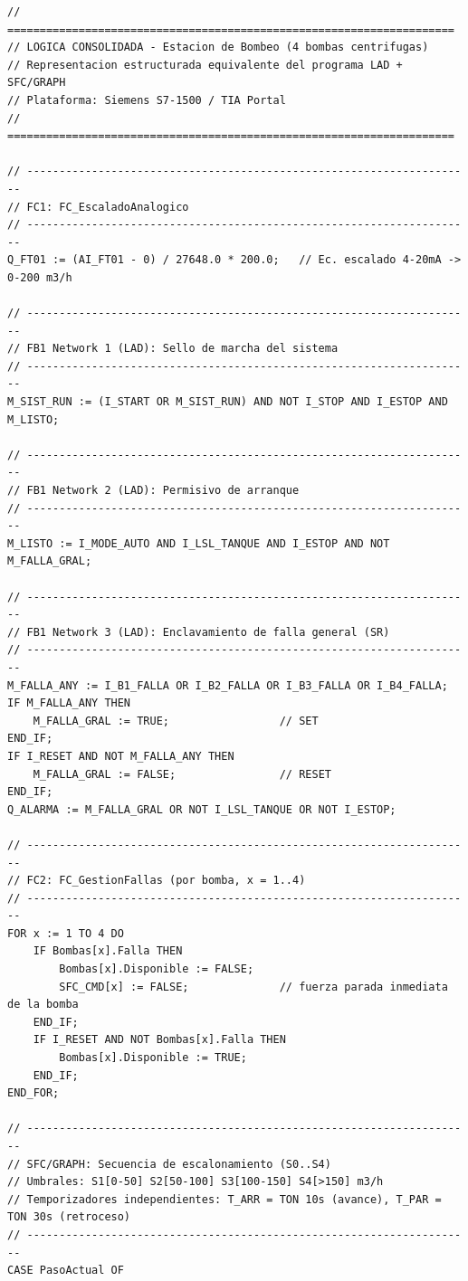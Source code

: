 \documentclass[conference]{IEEEtran}
\begin{document}
\begin{lstlisting}[caption={Equivalente estructurado consolidado de la lógica LAD + SFC}, label={lst:consolidado}]
// =====================================================================
// LOGICA CONSOLIDADA - Estacion de Bombeo (4 bombas centrifugas)
// Representacion estructurada equivalente del programa LAD + SFC/GRAPH
// Plataforma: Siemens S7-1500 / TIA Portal
// =====================================================================

// ---------------------------------------------------------------------
// FC1: FC_EscaladoAnalogico
// ---------------------------------------------------------------------
Q_FT01 := (AI_FT01 - 0) / 27648.0 * 200.0;   // Ec. escalado 4-20mA -> 0-200 m3/h

// ---------------------------------------------------------------------
// FB1 Network 1 (LAD): Sello de marcha del sistema
// ---------------------------------------------------------------------
M_SIST_RUN := (I_START OR M_SIST_RUN) AND NOT I_STOP AND I_ESTOP AND M_LISTO;

// ---------------------------------------------------------------------
// FB1 Network 2 (LAD): Permisivo de arranque
// ---------------------------------------------------------------------
M_LISTO := I_MODE_AUTO AND I_LSL_TANQUE AND I_ESTOP AND NOT M_FALLA_GRAL;

// ---------------------------------------------------------------------
// FB1 Network 3 (LAD): Enclavamiento de falla general (SR)
// ---------------------------------------------------------------------
M_FALLA_ANY := I_B1_FALLA OR I_B2_FALLA OR I_B3_FALLA OR I_B4_FALLA;
IF M_FALLA_ANY THEN
    M_FALLA_GRAL := TRUE;                 // SET
END_IF;
IF I_RESET AND NOT M_FALLA_ANY THEN
    M_FALLA_GRAL := FALSE;                // RESET
END_IF;
Q_ALARMA := M_FALLA_GRAL OR NOT I_LSL_TANQUE OR NOT I_ESTOP;

// ---------------------------------------------------------------------
// FC2: FC_GestionFallas (por bomba, x = 1..4)
// ---------------------------------------------------------------------
FOR x := 1 TO 4 DO
    IF Bombas[x].Falla THEN
        Bombas[x].Disponible := FALSE;
        SFC_CMD[x] := FALSE;              // fuerza parada inmediata de la bomba
    END_IF;
    IF I_RESET AND NOT Bombas[x].Falla THEN
        Bombas[x].Disponible := TRUE;
    END_IF;
END_FOR;

// ---------------------------------------------------------------------
// SFC/GRAPH: Secuencia de escalonamiento (S0..S4)
// Umbrales: S1[0-50] S2[50-100] S3[100-150] S4[>150] m3/h
// Temporizadores independientes: T_ARR = TON 10s (avance), T_PAR = TON 30s (retroceso)
// ---------------------------------------------------------------------
CASE PasoActual OF


\end{lstlisting}
\end{document}
